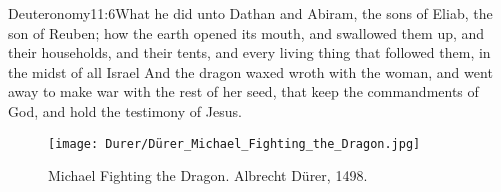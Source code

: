 				  {Deuteronomy}{11:6}{What he did unto Dathan and Abiram, the sons of Eliab, the son of Reuben; how the earth opened its mouth, and swallowed them up, and their households, and their tents, and every living thing that followed them, in the midst of all Israel}
And the dragon waxed wroth with the woman, and went away to make war with the rest of her seed, that keep the commandments of God, and hold the testimony of Jesus.%

\begin{figure*}[p]
  	\centering
  	\texttt{[image: Durer/Dürer\_Michael\_Fighting\_the\_Dragon.jpg]}
  	\caption[Michael Fighting the Dragon]{Michael Fighting the Dragon. Albrecht Dürer, 1498.}
  \end{figure*}
